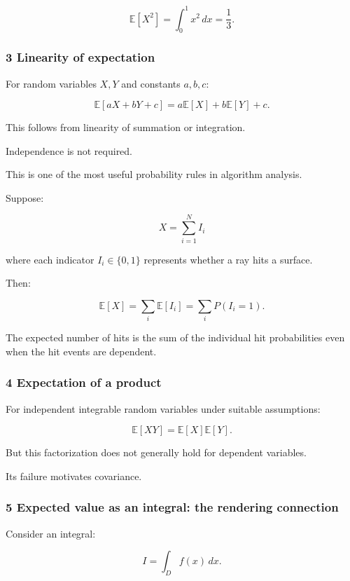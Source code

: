 \[
 \mathbb E[X^2] = \int_0^1x^2\,dx =\boxed{\frac13}.
\]

\subsubsection{3 Linearity of expectation}\label{02-foundations-ii-ch023-linearity-of-expectation}

For random variables \(X,Y\) and constants \(a,b,c\):

\[
 \boxed{ \mathbb E[aX+bY+c] = a\mathbb E[X]+b\mathbb E[Y]+c }.
\]

This follows from linearity of summation or integration.

Independence is not required.

This is one of the most useful probability rules in algorithm analysis.

Suppose:

\[
 X=\sum_{i=1}^NI_i
\]

where each indicator \(I_i\in\{0,1\}\) represents whether a ray hits a surface.

Then:

\[
 \mathbb E[X] = \sum_i\mathbb E[I_i] = \sum_iP(I_i=1).
\]

The expected number of hits is the sum of the individual hit probabilities even when the hit events are dependent.

\subsubsection{4 Expectation of a product}\label{02-foundations-ii-ch023-expectation-of-a-product}

For independent integrable random variables under suitable assumptions:

\[
 \boxed{ \mathbb E[XY]=\mathbb E[X]\mathbb E[Y] }.
\]

But this factorization does not generally hold for dependent variables.

Its failure motivates covariance.

\subsubsection{5 Expected value as an integral: the rendering connection}\label{02-foundations-ii-ch023-expected-value-as-an-integral-the-rendering-connection}

Consider an integral:

\[
 I=\int_Df(x)\,dx.
\]

